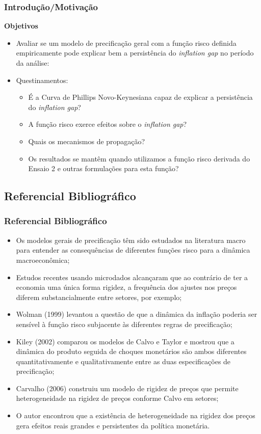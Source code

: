\documentclass[aspectratio=169]{beamer}
\begin{document}
\begin{frame}\frametitle{Introdução/Motivação}
\textbf{Objetivos}
\begin{itemize}
\item Avaliar se um modelo de precificação geral com a função risco definida empiricamente pode explicar bem a persistência do \emph{inflation gap} no período da análise:
\item Questinamentos:
  \begin{itemize}
  \item É a Curva de Phillips Novo-Keynesiana capaz de explicar a persistência do \emph{inflation gap}?
  \item A função risco exerce efeitos sobre o \emph{inflation gap}?
  \item Quais os mecanismos de propagação?
  \item Os resultados se mantêm quando utilizamos a função risco derivada do Ensaio 2 e outras formulações para esta função?
  \end{itemize}
\end{itemize}
\end{frame}

\subsection{Referencial Bibliográfico}

\begin{frame}\frametitle{Referencial Bibliográfico}
  \begin{itemize}
  \item Os modelos gerais de precificação têm sido estudados na literatura macro para entender as consequências de diferentes funções risco para a dinâmica macroeconômica;
  \item Estudos recentes usando microdados alcançaram que ao contrário de ter a economia uma única forma rigidez, a frequência dos ajustes nos preços diferem substancialmente entre setores, por exemplo;
  \item Wolman (1999) levantou a questão de que a dinâmica da inflação poderia ser sensível à função risco subjacente às diferentes regras de precificação;
  \item Kiley (2002) comparou os modelos de Calvo e Taylor e mostrou que a dinâmica do produto seguida de choques monetários são ambos diferentes quantitativamente e qualitativamente entre as duas especificações de precificação;
  \item Carvalho (2006) construiu um modelo de rigidez de preços que permite heterogeneidade na rigidez de preços conforme Calvo em setores;
  \item O autor encontrou que a existência de heterogeneidade na rigidez dos preços gera efeitos reais grandes e persistentes da política monetária.
  \end{itemize}
\end{frame}
\end{document}
